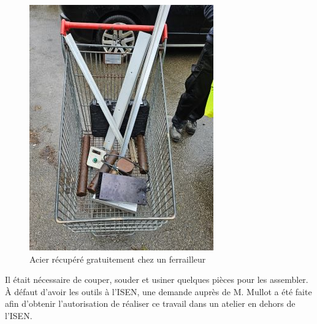 \documentclass{article}
\begin{document}
\begin{figure}[H]
\begin{minipage}{0.45\textwidth}
        \centering
        \includegraphics[width=\linewidth, angle=270]{Images/photoFabrications/courses.jpg}
        
    \end{minipage}
    \caption{Acier récupéré gratuitement chez un ferrailleur}
    \label{fig:acier_ferailleur-1}
\end{figure}
\noindent
Il était nécessaire de couper, souder et usiner quelques pièces pour les assembler. À défaut d'avoir les outils à l'ISEN, une demande auprès de M. Mullot a été faite afin d'obtenir l'autorisation de réaliser ce travail dans un atelier en dehors de l'ISEN.
\end{document}

